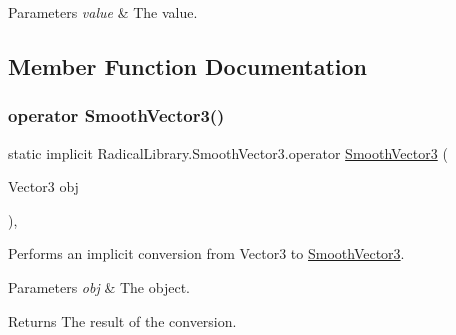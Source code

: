 \begin{DoxyParams}{Parameters}
{\em value} & The value.\\
\hline
\end{DoxyParams}


\subsection{Member Function Documentation}
\mbox{\label{class_radical_library_1_1_smooth_vector3_a2483e5c896cdd26188d13554cc7c5078}} 
\subsubsection{\texorpdfstring{operator Smooth\+Vector3()}{operator SmoothVector3()}}
{\footnotesize\ttfamily static implicit Radical\+Library.\+Smooth\+Vector3.\+operator \hyperlink{class_radical_library_1_1_smooth_vector3}{Smooth\+Vector3} (\begin{DoxyParamCaption}\item[{Vector3}]{obj }\end{DoxyParamCaption})\hspace{0.3cm}{\ttfamily [inline]}, {\ttfamily [static]}}



Performs an implicit conversion from Vector3 to \hyperlink{class_radical_library_1_1_smooth_vector3}{Smooth\+Vector3}. 


\begin{DoxyParams}{Parameters}
{\em obj} & The object.\\
\hline
\end{DoxyParams}
\begin{DoxyReturn}{Returns}
The result of the conversion.
\end{DoxyReturn}
\mbox{\label{class_radical_library_1_1_smooth_vector3_a988fe9c1a29aa3ff9780f0df95b93c5b}} 
